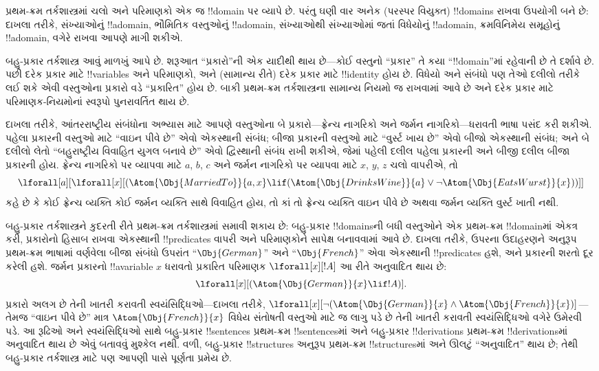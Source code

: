 \documentclass[../../../include/open-logic-section]{subfiles}
\begin{document}


પ્રથમ-ક્રમ તર્કશાસ્ત્રમાં ચલો અને પરિમાણકો એક જ !!{domain} પર
વ્યાપે છે. પરંતુ ઘણી વાર અનેક (પરસ્પર વિયુક્ત) !!{domain}s રાખવા
ઉપયોગી બને છે: દાખલા તરીકે, સંખ્યાઓનું !!a{domain}, ભૌમિતિક વસ્તુઓનું
!!a{domain}, સંખ્યાઓથી સંખ્યાઓમાં જતાં વિધેયોનું !!a{domain},
ક્રમવિનિમેય સમૂહોનું !!a{domain}, વગેરે રાખવા આપણે માગી શકીએ.

બહુ-પ્રકાર તર્કશાસ્ત્ર આવું માળખું આપે છે. શરૂઆત ``પ્રકારો''ની એક
યાદીથી થાય છે---કોઈ વસ્તુનો ``પ્રકાર'' તે કયા ``!!{domain}''માં રહેવાની
છે તે દર્શાવે છે. પછી દરેક પ્રકાર માટે !!{variable}s અને પરિમાણકો, અને
(સામાન્ય રીતે) દરેક પ્રકાર માટે !!{identity} હોય છે. વિધેયો અને સંબંધો
પણ તેઓ દલીલો તરીકે લઈ શકે એવી વસ્તુઓના પ્રકારો વડે ``પ્રકારિત'' હોય
છે. બાકી પ્રથમ-ક્રમ તર્કશાસ્ત્રના સામાન્ય નિયમો જ રાખવામાં આવે છે અને
દરેક પ્રકાર માટે પરિમાણક-નિયમોનાં સ્વરૂપો પુનરાવર્તિત થાય છે.

દાખલા તરીકે, આંતરરાષ્ટ્રીય સંબંધોના અભ્યાસ માટે આપણે વસ્તુઓના બે
પ્રકારો---ફ્રેન્ચ નાગરિકો અને જર્મન નાગરિકો---ધરાવતી ભાષા પસંદ કરી
શકીએ. પહેલા પ્રકારની વસ્તુઓ માટે ``વાઇન પીવે છે'' એવો એકસ્થાની સંબંધ;
બીજા પ્રકારની વસ્તુઓ માટે ``વુર્સ્ટ ખાય છે'' એવો બીજો એકસ્થાની સંબંધ;
અને બે દલીલો લેતો ``બહુરાષ્ટ્રીય વિવાહિત યુગલ બનાવે છે'' એવો દ્વિસ્થાની
સંબંધ રાખી શકીએ, જેમાં પહેલી દલીલ પહેલા પ્રકારની અને બીજી દલીલ બીજા
પ્રકારની હોય. ફ્રેન્ચ નાગરિકો પર વ્યાપવા માટે $a$, $b$, $c$ અને જર્મન
નાગરિકો પર વ્યાપવા માટે $x$, $y$, $z$ ચલો વાપરીએ, તો
\[
\lforall[a][\lforall[x][(\Atom{\Obj{MarriedTo}}{a,x} \lif
(\Atom{\Obj{DrinksWine}}{a} \lor \lnot \Atom{\Obj{EatsWurst}}{x}))]]
\]
કહે છે કે કોઈ ફ્રેન્ચ વ્યક્તિ કોઈ જર્મન વ્યક્તિ સાથે વિવાહિત હોય, તો
કાં તો ફ્રેન્ચ વ્યક્તિ વાઇન પીવે છે અથવા જર્મન વ્યક્તિ વુર્સ્ટ ખાતી
નથી.

બહુ-પ્રકાર તર્કશાસ્ત્રને કુદરતી રીતે પ્રથમ-ક્રમ તર્કશાસ્ત્રમાં સમાવી
શકાય છે: બહુ-પ્રકાર !!{domain}sની બધી વસ્તુઓને એક પ્રથમ-ક્રમ
!!{domain}માં એકત્ર કરી, પ્રકારોનો હિસાબ રાખવા એકસ્થાની !!{predicate}s
વાપરી અને પરિમાણકોને સાપેક્ષ બનાવવામાં આવે છે. દાખલા તરીકે, ઉપરના
ઉદાહરણને અનુરૂપ પ્રથમ-ક્રમ ભાષામાં વર્ણવેલા બીજા સંબંધો ઉપરાંત
``$\Obj{German}$'' અને ``$\Obj{French}$'' એવા એકસ્થાની !!{predicate}s
હશે, અને પ્રકારની શરતો દૂર કરેલી હશે. જર્મન પ્રકારનો !!a{variable}
$x$ ધરાવતો પ્રકારિત પરિમાણક $\lforall[x][!A]$ આ રીતે અનુવાદિત થાય છે:
\[
\lforall[x][(\Atom{\Obj{German}}{x} \lif !A)].
\]
પ્રકારો અલગ છે તેની ખાતરી કરાવતી સ્વયંસિદ્ધિઓ---દાખલા તરીકે,
$\lforall[x][\lnot (\Atom{\Obj{German}}{x} \land
  \Atom{\Obj{French}}{x})]$---તેમજ ``વાઇન પીવે છે'' માત્ર
$\Atom{\Obj{French}}{x}$ વિધેય સંતોષતી વસ્તુઓ માટે જ લાગુ પડે છે તેની
ખાતરી કરાવતી સ્વયંસિદ્ધિઓ વગેરે ઉમેરવી પડે. આ રૂઢિઓ અને સ્વયંસિદ્ધિઓ
સાથે બહુ-પ્રકાર !!{sentence}s પ્રથમ-ક્રમ !!{sentence}sમાં અને
બહુ-પ્રકાર !!{derivation}s પ્રથમ-ક્રમ !!{derivation}sમાં અનુવાદિત થાય
છે એવું બતાવવું મુશ્કેલ નથી. વળી, બહુ-પ્રકાર !!{structure}s અનુરૂપ
પ્રથમ-ક્રમ !!{structure}sમાં અને ઊલટું ``અનુવાદિત'' થાય છે; તેથી
બહુ-પ્રકાર તર્કશાસ્ત્ર માટે પણ આપણી પાસે પૂર્ણતા પ્રમેય છે.
\end{document}
